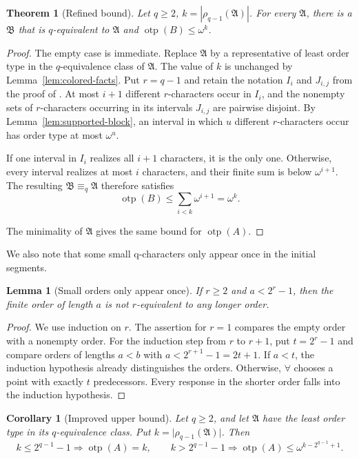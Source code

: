 \documentclass{amsart}
\newtheorem{theorem}{Theorem}
\newtheorem{lemma}{Lemma}
\newtheorem{corollary}{Corollary}
\theoremstyle{definition}
\begin{document}
\begin{theorem}[Refined bound]\label{thm:refined-bound}
    Let $q\geq2$, $k=|\rho_{q-1}(\mathfrak A)|$. For every $\mathfrak A$, there is a $\mathfrak B$ that is $q$-equivalent to $\mathfrak A$ and $\operatorname{otp}(B)\leq\omega^k$.
\end{theorem}
\begin{proof}
    The empty case is immediate. Replace $\mathfrak A$ by a representative of least order type in the $q$-equivalence class of $\mathfrak A$. The value of $k$ is unchanged by Lemma~\ref{lem:colored-facts}. Put $r=q-1$ and retain the notation $I_i$ and $J_{i,j}$ from the proof of \cite[Theorem~3.4]{Mwesigye2018}. At most $i+1$ different $r$-characters occur in $I_i$, and the nonempty sets of $r$-characters occurring in its intervals $J_{i,j}$ are pairwise disjoint. By Lemma~\ref{lem:supported-block}, an interval in which $u$ different $r$-characters occur has order type at most $\omega^u$.
    
    If one interval in $I_i$ realizes all $i+1$ characters, it is the only one. Otherwise, every interval realizes at most $i$ characters, and their finite sum is below $\omega^{i+1}$. The resulting $\mathfrak B\equiv_q\mathfrak A$ therefore satisfies
    $$\operatorname{otp}(B)\leq\sum_{i<k}\omega^{i+1}=\omega^k.$$
    
    The minimality of $\mathfrak A$ gives the same bound for $\operatorname{otp}(A)$.
\end{proof}

We also note that some small q-characters only appear once in the initial segments.
\begin{lemma}[Small orders only appear once]\label{lem:small-chain}
    If $r\geq2$ and $a<2^r-1$, then the finite order of length $a$ is not $r$-equivalent to any longer order.
\end{lemma}
\begin{proof}
    We use induction on $r$. The assertion for $r=1$ compares the empty order with a nonempty order. For the induction step from $r$ to $r+1$, put $t=2^r-1$ and compare orders of lengths $a<b$ with $a<2^{r+1}-1=2t+1$. If $a<t$, the induction hypothesis already distinguishes the orders. Otherwise, $\forall$ chooses a point with exactly $t$ predecessors. Every response in the shorter order falls into the induction hypothesis.
\end{proof}

\begin{corollary}[Improved upper bound]\label{thm:improved-bound}
Let $q\geq2$, and let $\mathfrak A$ have the least order type in its
$q$-equivalence class. Put $k=\lvert\rho_{q-1}(\mathfrak A)\rvert$. Then
$$k\leq 2^{q-1}-1\Longrightarrow\operatorname{otp}(A)=k,\qquad k>2^{q-1}-1\Longrightarrow\operatorname{otp}(A)\leq\omega^{k-2^{q-1}+1}.$$
\end{corollary}
\end{document}
